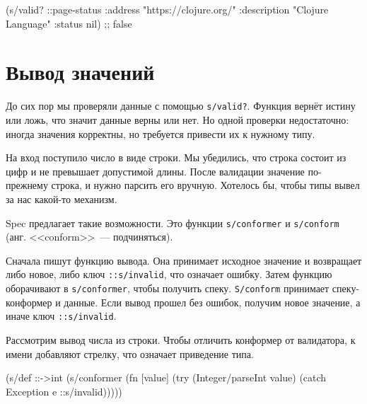 \begin{english}
  \begin{clojure}
(s/valid? ::page-status
          {:address "https://clojure.org/"
           :description "Clojure Language"
           :status nil})
;; false
  \end{clojure}
\end{english}

\section{Вывод значений}

\label{spec-conform}


До сих пор мы проверяли данные с помощью \verb|s/valid?|. Функция вернёт
истину или ложь, что значит данные верны или нет. Но одной проверки
недостаточно: иногда значения корректны, но требуется привести их к нужному
типу.

На вход поступило число в виде строки. Мы убедились, что строка состоит из цифр
и не превышает допустимой длины. После валидации значение по-прежнему строка, и
нужно парсить его вручную. Хотелось бы, чтобы типы вывел за нас какой-то
механизм.


Spec предлагает такие возможности. Это функции \verb|s/conformer| и
\verb|s/conform| (анг. <<conform>>~--- подчиняться).

\label{spec-invalid}



Сначала пишут функцию вывода. Она принимает исходное значение и возвращает либо
новое, либо ключ \verb|::s/invalid|, что означает ошибку. Затем функцию
оборачивают в \verb|s/conformer|, чтобы получить спеку. \verb|S/conform|
принимает спеку-конформер и данные. Если вывод прошел без ошибок, получим новое
значение, а иначе ключ \verb|::s/invalid|.

Рассмотрим вывод числа из строки. Чтобы отличить конформер от валидатора, к
имени добавляют стрелку, что означает приведение типа.

\begin{english}
  \begin{clojure}
(s/def ::->int
  (s/conformer
   (fn [value]
     (try
       (Integer/parseInt value)
       (catch Exception e
         ::s/invalid)))))
  \end{clojure}
\end{english}

